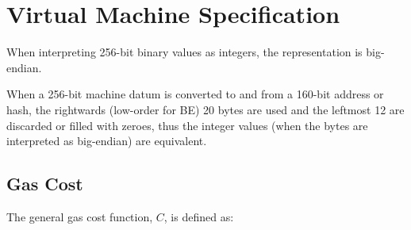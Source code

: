\documentclass[9pt,oneside]{amsart}
\begin{document}
\section{Virtual Machine Specification}\label{app:vm}

When interpreting 256-bit binary values as integers, the representation is big-endian.

When a 256-bit machine datum is converted to and from a 160-bit address or hash, the rightwards (low-order for BE) 20 bytes are used and the leftmost 12 are discarded or filled with zeroes, thus the integer values (when the bytes are interpreted as big-endian) are equivalent.

\subsection{Gas Cost}

The general gas cost function, $C$, is defined as:
\end{document}
